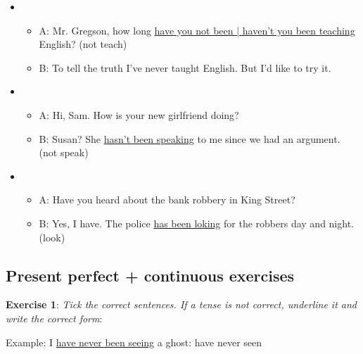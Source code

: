 \begin{itemize}
\item
\begin{itemize}
\item A: Mr. Gregson, how long \underline{have you not been | haven't you been teaching} English? (not teach)
\item B: To tell the truth I've never taught English. But I'd like to try it.
\end{itemize}

\item
\begin{itemize}
\item A: Hi, Sam. How is your new girlfriend doing?
\item B: Susan? She \underline{hasn't been speaking} to me since we had an argument. (not speak)
\end{itemize}

\item
\begin{itemize}
\item A: Have you heard about the bank robbery in King Street?
\item B: Yes, I have. The police \underline{has been loking} for the robbers day and night. (look)
\end{itemize}

\end{itemize}

\subsection{Present perfect + continuous exercises}

\textbf{Exercise 1}: \textit{Tick the correct sentences. If a tense is not correct, underline it and write the correct form}:

Example:
I \underline{have never been seeing} a ghost: have never seen

